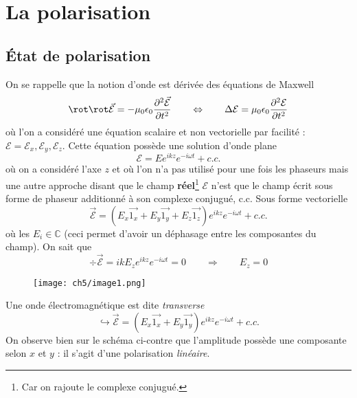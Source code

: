 \chapter{La polarisation}
\section{État de polarisation}
On se rappelle que la notion d'onde est dérivée des équations de Maxwell
\begin{equation}
\rot\rot\vec{\mathcal{E}} = -\mu_0\epsilon_0\dfrac{\partial^2\vec{\mathcal{E}}}{\partial t^2}\qquad\Leftrightarrow
\qquad \Delta\mathcal{E}= \mu_0\epsilon_0\dfrac{\partial^2\mathcal{E}}{\partial t^2}
\end{equation}
où l'on a considéré une équation scalaire et non vectorielle par facilité : $\mathcal{E} = \mathcal{E}_x
,\mathcal{E}_y, \mathcal{E}_z$. Cette équation possède une solution d'onde plane 
\begin{equation}
\mathcal{E} = Ee^{ikz}e^{-i\omega t} + c.c.
\end{equation}
où on a considéré l'axe $z$ et où l'on n'a pas utilisé pour une fois les phaseurs mais une autre approche disant 
que le champ \textbf{réel}\footnote{Car on rajoute le complexe conjugué.} $\mathcal{E}$ n'est que le champ écrit 
sous forme de phaseur additionné à son complexe conjugué, c.c. Sous forme vectorielle
\begin{equation}
\vec{\mathcal{E}} = (E_x\vec{1_x}+E_y\vec{1_y}+E_z\vec{1_z})e^{ikz}e^{-i\omega t} + c.c.
\end{equation}
où les $E_i\in\mathbb{C}$ (ceci permet d'avoir un déphasage entre les composantes du champ). On sait que
\begin{equation}
\div \vec{\mathcal{E}} = ikE_z e^{ikz}e^{-i\omega t} = 0\qquad\Rightarrow\qquad E_z=0
\end{equation}

	\begin{wrapfigure}[11]{r}{3.5cm}
	\vspace{-5mm}
	\texttt{[image: ch5/image1.png]}
	\end{wrapfigure}
Une onde électromagnétique est dite \textit{transverse}
\begin{equation}
\hookrightarrow \vec{\mathcal{E}} = (E_x\vec{1_x}+E_y\vec{1_y})e^{ikz}e^{-i\omega t} + c.c.
\end{equation}
On observe bien sur le schéma ci-contre que l'amplitude possède une composante selon $x$ et $y$ : il 
s'agit d'une polarisation \textit{linéaire}.

